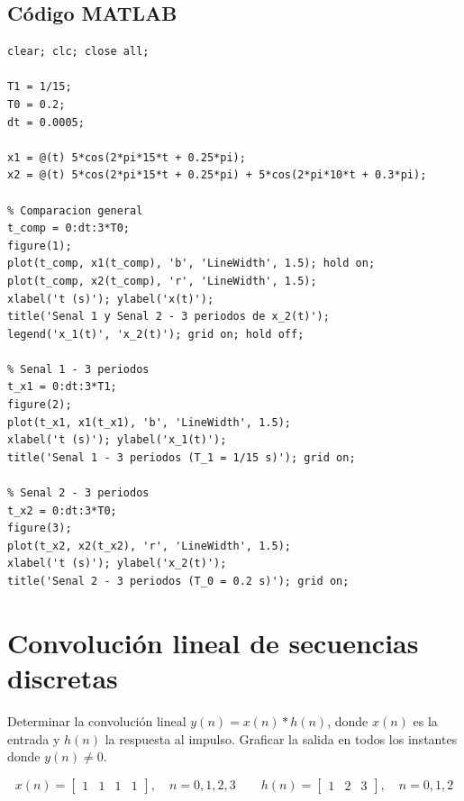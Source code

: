 \documentclass[../Main_Include.tex]{subfiles}
\begin{document}
\subsection*{Código MATLAB}

\begin{lstlisting}[style=matlab_dark,
    caption={Ejercicio 1 — Periodicidad y graficación de señales continuas},
    label={lst:ej1}]
% ETN1015 - Ejercicio 1
clear; clc; close all;

T1 = 1/15;
T0 = 0.2;
dt = 0.0005;

x1 = @(t) 5*cos(2*pi*15*t + 0.25*pi);
x2 = @(t) 5*cos(2*pi*15*t + 0.25*pi) + 5*cos(2*pi*10*t + 0.3*pi);

% Comparacion general
t_comp = 0:dt:3*T0;
figure(1);
plot(t_comp, x1(t_comp), 'b', 'LineWidth', 1.5); hold on;
plot(t_comp, x2(t_comp), 'r', 'LineWidth', 1.5);
xlabel('t (s)'); ylabel('x(t)');
title('Senal 1 y Senal 2 - 3 periodos de x_2(t)');
legend('x_1(t)', 'x_2(t)'); grid on; hold off;

% Senal 1 - 3 periodos
t_x1 = 0:dt:3*T1;
figure(2);
plot(t_x1, x1(t_x1), 'b', 'LineWidth', 1.5);
xlabel('t (s)'); ylabel('x_1(t)');
title('Senal 1 - 3 periodos (T_1 = 1/15 s)'); grid on;

% Senal 2 - 3 periodos
t_x2 = 0:dt:3*T0;
figure(3);
plot(t_x2, x2(t_x2), 'r', 'LineWidth', 1.5);
xlabel('t (s)'); ylabel('x_2(t)');
title('Senal 2 - 3 periodos (T_0 = 0.2 s)'); grid on;
\end{lstlisting}

\newpage
\section{Convolución lineal de secuencias discretas}

Determinar la convolución lineal $y(n) = x(n) * h(n)$, donde $x(n)$ es la
entrada y $h(n)$ la respuesta al impulso. Graficar la salida en todos los
instantes donde $y(n) \neq 0$.

\[
    x(n) = \begin{bmatrix} 1 & 1 & 1 & 1 \end{bmatrix}, \quad n = 0,1,2,3
    \qquad
    h(n) = \begin{bmatrix} 1 & 2 & 3 \end{bmatrix}, \quad n = 0,1,2
\]

\end{document}
